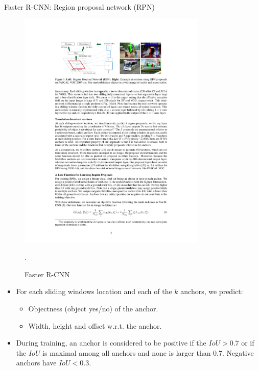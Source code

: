 \documentclass[xcolor=pdftex,dvipsnames,table]{beamer}
\begin{document}
\begin{frame}{Faster R-CNN: Region proposal network (RPN)}
\begin{figure}[htb]
   \centering
   \includegraphics[width=0.8\textwidth]{../graphics/Faster_R-CNN.pdf}
   \caption{Faster R-CNN \cite{Ren2017}}.
\end{figure}
\begin{itemize}
\item For each sliding windows location and each of the $k$ anchors, we predict:
\begin{itemize}
   \item Objectness (object yes/no) of the anchor.
   \item Width, height and offset w.r.t. the anchor.
\end{itemize}
\item During training, an anchor is considered to be positive if the $IoU>0.7$ or if the $IoU$ is maximal among all anchors and none is larger than 0.7. Negative anchors have $IoU<0.3$. 
\end{itemize}
\end{frame}
\end{document}
